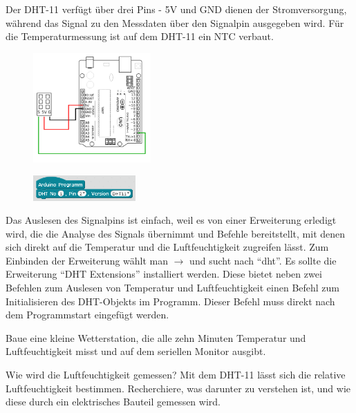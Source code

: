 Der DHT-11 verfügt über drei Pins - 5V und GND dienen der Stromversorgung, während das Signal zu den Messdaten über den Signalpin ausgegeben wird. Für die Temperaturmessung ist auf dem DHT-11 ein NTC verbaut.

\begin{figure}[H]
	\centering
	\includegraphics[width=0.4\textwidth]{./Zeichnungen/Schaltplan-DHT11.png}
\end{figure}

\vspace{-\baselineskip}
\begin{figure}
	\centering
	\includegraphics[width=0.35\textwidth]{./pics/dht-auslesen.png}
\end{figure}
Das Auslesen des Signalpins ist einfach, weil es von einer Erweiterung erledigt wird, die die Analyse des Signals übernimmt und Befehle bereitstellt, mit denen sich direkt auf die Temperatur und die Luftfeuchtigkeit zugreifen lässt. Zum Einbinden der Erweiterung wählt man  $\rightarrow$  und sucht nach \enquote{dht}. Es sollte die Erweiterung \enquote{DHT Extensions} installiert werden. Diese bietet neben zwei Befehlen zum Auslesen von Temperatur und Luftfeuchtigkeit einen Befehl zum Initialisieren des DHT-Objekts im Programm. Dieser Befehl muss direkt nach dem Programmstart eingefügt werden.

\bigskip
\begin{projekt}[Wetterstation]\label{proj:wetterstation}
	Baue eine kleine Wetterstation, die alle zehn Minuten Temperatur und Luftfeuchtigkeit misst und auf dem seriellen Monitor ausgibt.
\end{projekt}

\begin{recherche}{Wie wird die Luftfeuchtigkeit gemessen?}
	Mit dem DHT-11 lässt sich die relative Luftfeuchtigkeit bestimmen. Recherchiere, was darunter zu verstehen ist, und wie diese durch ein elektrisches Bauteil gemessen wird.
\end{recherche}


